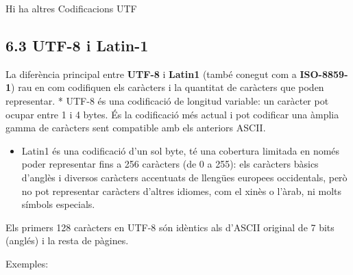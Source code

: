 \documentclass[
  12 pt,
  a4paper,
]{article}
\providecommand{\tightlist}{%
  \setlength{\itemsep}{0pt}\setlength{\parskip}{0pt}}
\begin{document}
Hi ha altres Codificacions UTF

\subsection{6.3 UTF-8 i Latin-1}\label{utf-8-i-latin-1}

La diferència principal entre \textbf{UTF-8} i \textbf{Latin1} (també
conegut com a \textbf{ISO-8859-1}) rau en com codifiquen els caràcters i
la quantitat de caràcters que poden representar. * UTF-8 és una
codificació de longitud variable: un caràcter pot ocupar entre 1 i 4
bytes. És la codificació més actual i pot codificar una àmplia gamma de
caràcters sent compatible amb els anteriors ASCII.

\begin{itemize}
\tightlist
\item
  Latin1 és una codificació d'un sol byte, té una cobertura limitada en
  només poder representar fins a 256 caràcters (de 0 a 255): els
  caràcters bàsics d'anglès i diversos caràcters accentuats de llengües
  europees occidentals, però no pot representar caràcters d'altres
  idiomes, com el xinès o l'àrab, ni molts símbols especials.
\end{itemize}

Els primers 128 caràcters en UTF-8 són idèntics als d'ASCII original de
7 bits (anglés) i la resta de pàgines.

Exemples:
\end{document}
